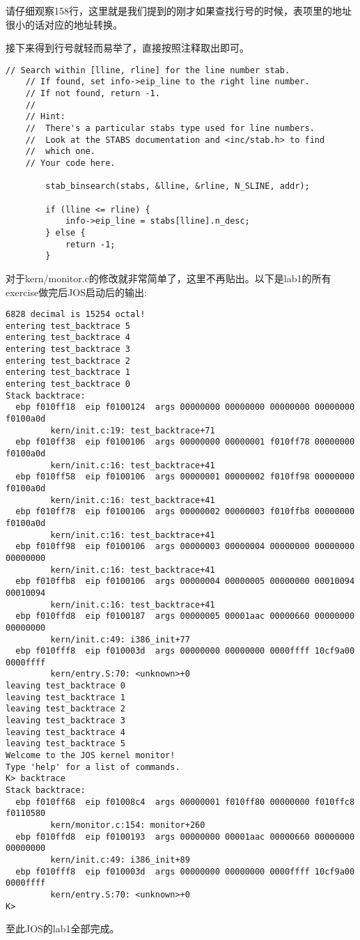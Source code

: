 \documentclass{article}
\begin{document}
\begin{CJK*}{UTF8}{gkai}
请仔细观察158行，这里就是我们提到的刚才如果查找行号的时候，表项里的地址很小的话对应的地址转换。

接下来得到行号就轻而易举了，直接按照注释取出即可。

\begin{lstlisting}[style=ccode, firstnumber=173, title={\scriptsize \ttfamily \bfseries kern/kdebug.c}]
	// Search within [lline, rline] for the line number stab.
	// If found, set info->eip_line to the right line number.
	// If not found, return -1.
	//
	// Hint:
	//	There's a particular stabs type used for line numbers.
	//	Look at the STABS documentation and <inc/stab.h> to find
	//	which one.
	// Your code here.
    
        stab_binsearch(stabs, &lline, &rline, N_SLINE, addr);

        if (lline <= rline) {
            info->eip_line = stabs[lline].n_desc;
        } else {
            return -1;
        }
\end{lstlisting}

对于kern/monitor.c的修改就非常简单了，这里不再贴出。以下是lab1的所有exercise做完后JOS启动后的输出:

\begin{lstlisting}[style=console]
6828 decimal is 15254 octal!
entering test_backtrace 5
entering test_backtrace 4
entering test_backtrace 3
entering test_backtrace 2
entering test_backtrace 1
entering test_backtrace 0
Stack backtrace:
  ebp f010ff18  eip f0100124  args 00000000 00000000 00000000 00000000 f0100a0d
         kern/init.c:19: test_backtrace+71
  ebp f010ff38  eip f0100106  args 00000000 00000001 f010ff78 00000000 f0100a0d
         kern/init.c:16: test_backtrace+41
  ebp f010ff58  eip f0100106  args 00000001 00000002 f010ff98 00000000 f0100a0d
         kern/init.c:16: test_backtrace+41
  ebp f010ff78  eip f0100106  args 00000002 00000003 f010ffb8 00000000 f0100a0d
         kern/init.c:16: test_backtrace+41
  ebp f010ff98  eip f0100106  args 00000003 00000004 00000000 00000000 00000000
         kern/init.c:16: test_backtrace+41
  ebp f010ffb8  eip f0100106  args 00000004 00000005 00000000 00010094 00010094
         kern/init.c:16: test_backtrace+41
  ebp f010ffd8  eip f0100187  args 00000005 00001aac 00000660 00000000 00000000
         kern/init.c:49: i386_init+77
  ebp f010fff8  eip f010003d  args 00000000 00000000 0000ffff 10cf9a00 0000ffff
         kern/entry.S:70: <unknown>+0
leaving test_backtrace 0
leaving test_backtrace 1
leaving test_backtrace 2
leaving test_backtrace 3
leaving test_backtrace 4
leaving test_backtrace 5
Welcome to the JOS kernel monitor!
Type 'help' for a list of commands.
K> backtrace
Stack backtrace:
  ebp f010ff68  eip f01008c4  args 00000001 f010ff80 00000000 f010ffc8 f0110580
         kern/monitor.c:154: monitor+260
  ebp f010ffd8  eip f0100193  args 00000000 00001aac 00000660 00000000 00000000
         kern/init.c:49: i386_init+89
  ebp f010fff8  eip f010003d  args 00000000 00000000 0000ffff 10cf9a00 0000ffff
         kern/entry.S:70: <unknown>+0
K>
\end{lstlisting}

至此JOS的lab1全部完成。




\clearpage

\end{CJK*}
\end{document}
